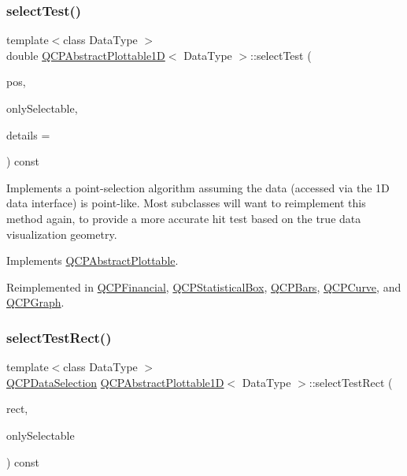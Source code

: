 \subsubsection{\texorpdfstring{select\+Test()}{selectTest()}}
{\footnotesize\ttfamily template$<$class Data\+Type $>$ \\
double \hyperlink{class_q_c_p_abstract_plottable1_d}{Q\+C\+P\+Abstract\+Plottable1D}$<$ Data\+Type $>$\+::select\+Test (\begin{DoxyParamCaption}\item[{const Q\+PointF \&}]{pos,  }\item[{bool}]{only\+Selectable,  }\item[{Q\+Variant $\ast$}]{details = {} }\end{DoxyParamCaption}) const\hspace{0.3cm}{\ttfamily [virtual]}}

Implements a point-\/selection algorithm assuming the data (accessed via the 1D data interface) is point-\/like. Most subclasses will want to reimplement this method again, to provide a more accurate hit test based on the true data visualization geometry.

Implements \hyperlink{class_q_c_p_abstract_plottable_a38efe9641d972992a3d44204bc80ec1d}{Q\+C\+P\+Abstract\+Plottable}.



Reimplemented in \hyperlink{class_q_c_p_financial_aac8e91622ac58330fa9ce81cc8fd40ee}{Q\+C\+P\+Financial}, \hyperlink{class_q_c_p_statistical_box_a1607fa92f829c631107c20ccb2d70a6d}{Q\+C\+P\+Statistical\+Box}, \hyperlink{class_q_c_p_bars_a121f899c27af3186fe93dcd0eb98f49b}{Q\+C\+P\+Bars}, \hyperlink{class_q_c_p_curve_a0ed9b7e6b4bc72010d6fcd974af46a8b}{Q\+C\+P\+Curve}, and \hyperlink{class_q_c_p_graph_a6d669d04462d272c6aa0e5f85846d673}{Q\+C\+P\+Graph}.

\mbox{\label{class_q_c_p_abstract_plottable1_d_ac385c38a79e419ed3600c2ee398fd216}} 
\subsubsection{\texorpdfstring{select\+Test\+Rect()}{selectTestRect()}}
{\footnotesize\ttfamily template$<$class Data\+Type $>$ \\
\hyperlink{class_q_c_p_data_selection}{Q\+C\+P\+Data\+Selection} \hyperlink{class_q_c_p_abstract_plottable1_d}{Q\+C\+P\+Abstract\+Plottable1D}$<$ Data\+Type $>$\+::select\+Test\+Rect (\begin{DoxyParamCaption}\item[{const Q\+RectF \&}]{rect,  }\item[{bool}]{only\+Selectable }\end{DoxyParamCaption}) const\hspace{0.3cm}{\ttfamily [virtual]}}

